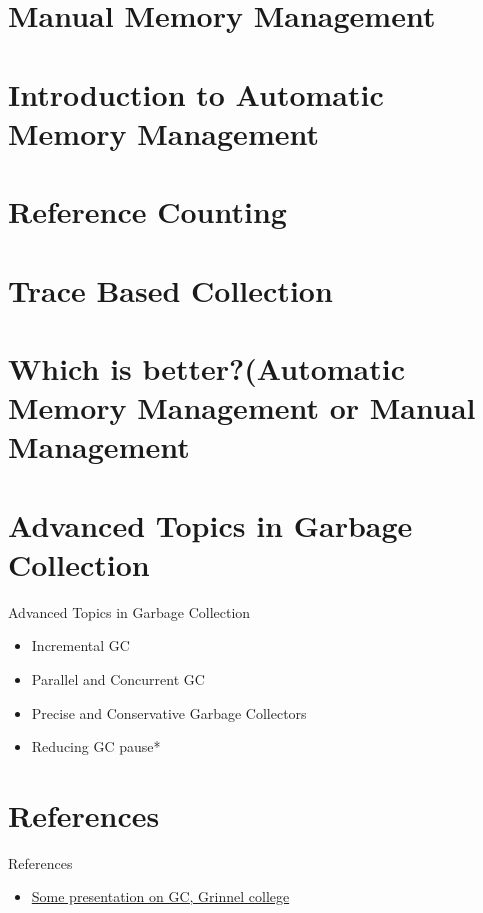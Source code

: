 \documentclass[
  10pt,
  ignorenonframetext,
]{beamer}
\providecommand{\tightlist}{%
  \setlength{\itemsep}{0pt}\setlength{\parskip}{0pt}}
\begin{document}
\hypertarget{manual-memory-management}{%
\section{Manual Memory
Management}\label{manual-memory-management}}

\hypertarget{introduction-to-automatic-memory-management}{%
\section{Introduction to Automatic Memory
Management}\label{introduction-to-automatic-memory-management}}

\hypertarget{reference-counting}{%
\section{Reference
Counting}\label{reference-counting}}

\hypertarget{trace-based-collection}{%
\section{Trace Based
Collection}\label{trace-based-collection}}

\hypertarget{which-is-betterautomatic-memory-management-or-manual-management}{%
\section{Which is better?(Automatic Memory
Management or Manual
Management}\label{which-is-betterautomatic-memory-management-or-manual-management}}

\hypertarget{advanced-topics-in-garbage-collection}{%
\section{Advanced Topics in Garbage
Collection}\label{advanced-topics-in-garbage-collection}}

\begin{frame}{Advanced Topics in Garbage
Collection}
\begin{itemize}
\item
  Incremental GC
\item
  Parallel and Concurrent GC
\item
  Precise and Conservative Garbage Collectors
\item
  Reducing GC pause*
\end{itemize}
\end{frame}

\hypertarget{references}{%
\section{References}\label{references}}

\begin{frame}{References}
\begin{itemize}
\tightlist
\item
  \href{https://rebelsky.cs.grinnell.edu/Courses/CS302/99S/Presentations/GC/}{Some
  presentation on GC, Grinnel college}
\end{itemize}
\end{frame}
\end{document}
